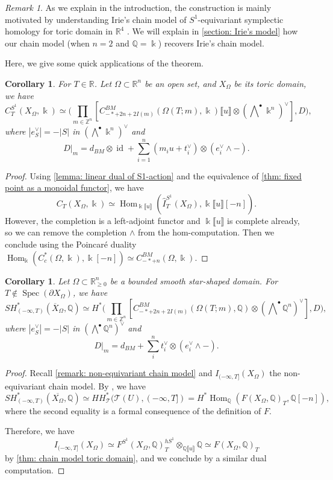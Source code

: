 \documentclass[11pt]{amsart}
\numberwithin{equation}{section}
\theoremstyle{plain}
\newtheorem{Coro}[coro]{Corollary}
\theoremstyle{definition}
\theoremstyle{remark}
\newtheorem{RMK}[rmk]{Remark}
\newcommand{\bQ} { {\mathbb{Q}}}
\newcommand{\bZ} { {\mathbb{Z}}}
\newcommand{\bR} { {\mathbb{R}}}
\newcommand{\sT} { {\mathscr{T}}}
\newcommand{\id}{{\operatorname{id}}}
\newcommand{\fpw}[1]{{\llbracket #1\rrbracket}}
\newcommand\Hom{\operatorname{Hom}}
\newcommand\Spec{\operatorname{Spec}}
\begin{document}
\begin{RMK}As we explain in the introduction, the construction is mainly motivated by understanding Irie's chain model of $S^1$-equivariant symplectic homology for toric domain in $\bR^4$ \cite{Irie_ChainModel}. We will explain in \autoref{section: Irie's model} how our chain model (when $n=2$ and $\bQ=\Bbbk$) recovers Irie's chain model.
\end{RMK}

Here, we give some quick applications of the theorem.
\begin{Coro}For $T\in \bR$. Let $\Omega\subset \bR^n$ be an open set, and $X_\Omega$ be its toric domain, we have
\[C^{S^1}_T(X_\Omega,\Bbbk)\simeq \Big( \prod_{m\in\bZ^n} \left[C^{BM}_{-*+2n+2I(m)}(\Omega(T;m),\Bbbk)\fpw{u}\otimes (\bigwedge\nolimits^\bullet \Bbbk ^n)^\vee\right],D\Big),\]
where $|e_S^\vee| =-|S|$ in $(\bigwedge\nolimits^\bullet \Bbbk ^n)^\vee$ and
\[D|_m=d_{BM}\otimes\id
+
\sum_{i=1}^n
(m_i u +t_i^\vee )\otimes(e_i^\vee\wedge -).
\]
\end{Coro}
\begin{proof}
    Using \autoref{lemma: linear dual of S1-action} and the equivalence of \autoref{thm: fixed point as a monoidal functor}, we have 
\[C_T(X_\Omega,\Bbbk)\simeq \Hom_{\Bbbk\fpw{u}}(\widehat{I}^{S^1}_{T}(X_\Omega),\Bbbk\fpw{u}[-n]).\]  
However, the completion is a left-adjoint functor and $\Bbbk\fpw{u}$ is complete already, so we can remove the completion $\wedge$ from the hom-computation. Then we conclude using the Poincar\'e duality $\Hom_{\Bbbk}(C_c^*(\Omega,\Bbbk),\Bbbk[-n])\simeq C^{BM}_{-*+n}(\Omega,\Bbbk)$.
\end{proof}

\begin{Coro}\label{coro: chain model compute SH}Let $\Omega\subset \bR^n_{\geq0}$ be a bounded smooth star-shaped domain. For $T \notin \Spec(\partial X_\Omega)$, we have
\[SH^*_{(-\infty,T)}(\overline{X}_\Omega,\bQ)\simeq H^* \Big( \prod_{m\in\bZ^n} \left[C^{BM}_{-*+2n+2I(m)}(\Omega(T;m),\bQ)\otimes (\bigwedge\nolimits^\bullet \bQ ^n)^\vee\right],D\Big),\]
where $|e_S^\vee| =-|S|$ in $(\bigwedge\nolimits^\bullet \bQ ^n)^\vee$ and 
\[D|_m=d_{BM} +\sum_{i}^n t_i^\vee \otimes(e_i^\vee\wedge -).\]
\end{Coro}
\begin{proof}Recall \autoref{remark: non-equivariant chain model} and $I_{(-\infty,T]}(X_\Omega)$ the non-equivariant chain model. By \cite{Hochschild-Kuo-Shende-Zhang}, we have
\[SH^*_{(-\infty,T)}(\overline{X_\Omega},\bQ)\simeq HH^*_\sT(\sT(U),(-\infty,T])= H^*\Hom_\bQ(F (X_\Omega,\bQ)_T,\bQ[-n]),\]
where the second equality is a formal consequence of the definition of $F$.

Therefore, we have
\[I_{(-\infty,T]}(X_\Omega)\simeq F^{S^1}(X_\Omega,\bQ)_T^{hS^1}\otimes_{\bQ\fpw{u}}\bQ \simeq F (X_\Omega,\bQ)_T\]
by \autoref{thm: chain model toric domain}, and we conclude by a similar dual computation.
\end{proof}
\end{document}
